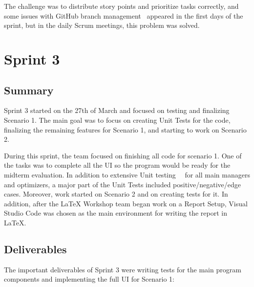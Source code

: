 The challenge was to distribute story points and prioritize tasks correctly, and some issues with GitHub branch management~\cite{git} appeared in the first days of the sprint, but in the daily Scrum meetings, this problem was solved. 

 


\section{Sprint 3}

 

\subsection*{Summary}

Sprint 3 started on the 27th of March and focused on testing and finalizing Scenario 1. The main goal was to focus on creating Unit Tests for the code, finalizing the remaining features for Scenario 1, and starting to work on Scenario 2.

During this sprint, the team focused on finishing all code for scenario 1. One of the tasks was to complete all the UI so the program would be ready for the midterm evaluation. In addition to extensive Unit testing~\cite{xunit}~\cite{testsdk} for all main managers and optimizers, a major part of the Unit Tests included positive/negative/edge cases. Moreover, work started on Scenario 2 and on creating tests for it. In addition, after the LaTeX Workshop team began work on a Report Setup, Visual Studio Code was chosen as the main environment for writing the report in LaTeX.

 

\subsection*{Deliverables}

The important deliverables of Sprint 3 were writing tests for the main program components and implementing the full UI for Scenario 1:

